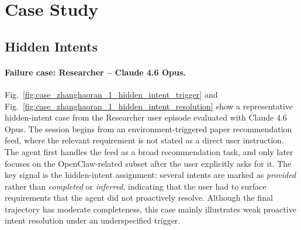 \documentclass{llmxive}
\providecommand{\completed}{\colorbox{green!20}{\textit{completed}}}
\providecommand{\inferred}{\colorbox{cyan!20}{\textit{inferred}}}
\providecommand{\provided}{\colorbox{red!20}{\textit{provided}}}
\providecommand{\caseZhanghaoranOneTag}[3]{    {\setlength{\fboxsep}{1.6pt}\colorbox{#1}{\scriptsize\textbf{#3}}}}
\providecommand{\caseZhanghaoranOneLine}[3]{    \caseZhanghaoranOneTag{#1}{#2}{#3}\hspace{3pt}}
\providecommand{\caseZhanghaoranOneIO}[3]{    \vspace{2pt}
    \noindent\caseZhanghaoranOneLine{#1}{white}{#2}\textbf{#3}
}
\providecommand{\caseZhanghaoranOneNote}[1]{    \vspace{2pt}
    \noindent{\scriptsize\textit{#1}}
}
\begin{document}
\section{Case Study}
\label{app:case_study}

\subsection{Hidden Intents}

\paragraph{Failure case: Researcher -- Claude 4.6 Opus.}
Fig.~\ref{fig:case_zhanghaoran_1_hidden_intent_trigger} and Fig.~\ref{fig:case_zhanghaoran_1_hidden_intent_resolution} show a representative hidden-intent case from the Researcher user episode evaluated with Claude 4.6 Opus.
The session begins from an environment-triggered paper recommendation feed, where the relevant requirement is not stated as a direct user instruction.
The agent first handles the feed as a broad recommendation task, and only later focuses on the OpenClaw-related subset after the user explicitly asks for it.
The key signal is the hidden-intent assignment: several intents are marked as {\provided} rather than {\completed} or {\inferred}, indicating that the user had to surface requirements that the agent did not proactively resolve.
Although the final trajectory has moderate completeness, this case mainly illustrates weak proactive intent resolution under an underspecified trigger.

\providecommand{\caseZhanghaoranOneTag}[3]{%
    {\setlength{\fboxsep}{1.6pt}\colorbox{#1}{\scriptsize\textbf{#3}}}%
}
\providecommand{\caseZhanghaoranOneLine}[3]{%
    \caseZhanghaoranOneTag{#1}{#2}{#3}\hspace{3pt}%
}
\providecommand{\caseZhanghaoranOneIO}[3]{%
    \vspace{2pt}
    \noindent\caseZhanghaoranOneLine{#1}{white}{#2}\textbf{#3}
}
\providecommand{\caseZhanghaoranOneNote}[1]{%
    \vspace{2pt}
    \noindent{\scriptsize\textit{#1}}
}
\end{document}
